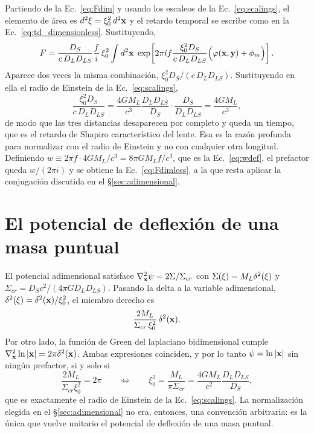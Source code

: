 \documentclass[11pt,a4paper,openany]{book}
\begin{document}
Partiendo de la Ec.~\eqref{eq:Fdim} y usando los escaleos de la
Ec.~\eqref{eq:scalings}, el elemento de \'area es
$d^{2}\vb\xi=\xi_0^{2}\,d^{2}\vb x$ y el retardo temporal se escribe como en
la Ec.~\eqref{eq:td_dimensionless}. Sustituyendo,
\begin{equation}
  F=\frac{D_S}{c\,D_LD_{LS}}\frac{f}{i}\,\xi_0^{2}
  \int d^{2}\vb x\;
  \exp\!\left[2\pi i f\frac{\xi_0^{2}D_S}{c\,D_LD_{LS}}
  \Big(\varphi(\vb x,\vb y)+\phi_m\Big)\right] .
  \label{eq:adim_step}
\end{equation}
Aparece dos veces la misma combinaci\'on,
$\xi_0^{2}D_S/(c\,D_LD_{LS})$. Sustituyendo en ella el radio de Einstein de la
Ec.~\eqref{eq:scalings},
\begin{equation}
  \frac{\xi_0^{2}D_S}{c\,D_LD_{LS}}
  =\frac{4GM_L}{c^{3}}\frac{D_LD_{LS}}{D_S}\cdot\frac{D_S}{D_LD_{LS}}
  =\frac{4GM_L}{c^{3}} ,
  \label{eq:combinacion}
\end{equation}
de modo que las tres distancias desaparecen por completo y queda un tiempo,
que es el retardo de Shapiro caracter\'istico del lente. Esa es la raz\'on
profunda para normalizar con el radio de Einstein y no con cualquier otra
longitud. Definiendo
$w\equiv2\pi f\cdot4GM_L/c^{3}=8\pi GM_Lf/c^{3}$, que es la
Ec.~\eqref{eq:wdef}, el prefactor queda $w/(2\pi i)$ y se obtiene la
Ec.~\eqref{eq:Fdimless}, a la que resta aplicar la conjugaci\'on discutida en
el \S\ref{sec:adimensional}.

\section{El potencial de deflexi\'on de una masa puntual}
\label{ap:psipoint}

El potencial adimensional satisface
$\nabla^{2}_{\vb x}\psi=2\Sigma/\Sigma_{cr}$ con
$\Sigma(\vb\xi)=M_L\delta^{2}(\vb\xi)$ y
$\Sigma_{cr}=D_Sc^{2}/(4\pi GD_LD_{LS})$. Pasando la delta a la variable
adimensional, $\delta^{2}(\vb\xi)=\delta^{2}(\vb x)/\xi_0^{2}$, el miembro
derecho es
\begin{equation}
  \frac{2M_L}{\Sigma_{cr}\,\xi_0^{2}}\,\delta^{2}(\vb x) .
  \label{eq:poisson_rhs}
\end{equation}
Por otro lado, la funci\'on de Green del laplaciano bidimensional cumple
$\nabla^{2}_{\vb x}\ln|\vb x|=2\pi\delta^{2}(\vb x)$. Ambas expresiones
coinciden, y por lo tanto $\psi=\ln|\vb x|$ sin ning\'un prefactor, si y solo
si
\begin{equation}
  \frac{2M_L}{\Sigma_{cr}\xi_0^{2}}=2\pi
  \qquad\Longleftrightarrow\qquad
  \xi_0^{2}=\frac{M_L}{\pi\Sigma_{cr}}
  =\frac{4GM_L}{c^{2}}\frac{D_LD_{LS}}{D_S} ,
  \label{eq:xi0_derivation}
\end{equation}
que es exactamente el radio de Einstein de la Ec.~\eqref{eq:scalings}. La
normalizaci\'on elegida en el \S\ref{sec:adimensional} no era, entonces, una
convenci\'on arbitraria: es la \'unica que vuelve unitario el potencial de
deflexi\'on de una masa puntual.
\end{document}
